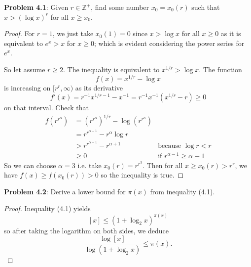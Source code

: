 \documentclass[12pt]{article}
\newcommand{\Z}{\mathbb{Z}}
\begin{document}
\fi

\textbf{Problem 4.1}: Given $r \in \Z^+$, find some number $x_0 = x_0(r)$ such that $x > (\log x)^r$ for all $x \geq x_0$.

\begin{proof}
For $r = 1$, we just take $x_0(1) = 0$ since $x > \log x$ for all $x \geq 0$ as it is equivalent to $e^x > x$ for $x \geq 0$; which is evident considering the power series for $e^x$.

So let assume $r \geq 2$. The inequality is equivalent to $x^{1/r} > \log x$. The function
$$f(x) = x^{1/r} - \log x$$
is increasing on $[r^r, \infty)$ as its derivative
$$f'(x) = r^{-1} x^{1/r - 1} - x^{-1} = r^{-1} x^{-1} (x^{1/r} - r) \geq 0$$
on that interval. Check that
\begin{align*}
f(r^{r^\alpha}) &= (r^{r^\alpha})^{1/r} - \log(r^{r^\alpha})\\
&= r^{r^{\alpha - 1}} - r^\alpha \log r\\
&> r^{r^{\alpha - 1}} - r^{\alpha + 1} &\text{because } \log r < r\\
&\geq 0 &\text{if } r^{\alpha - 1} \geq \alpha + 1
\end{align*}
So we can choose $\alpha = 3$ i.e. take $x_0(r) = r^{r^3}$. Then for all $x \geq x_0(r) > r^r$, we have $f(x) \geq f(x_0(r)) > 0$ so the inequality is true. 
\end{proof}

\textbf{Problem 4.2}: Derive a lower bound for $\pi(x)$ from inequality (4.1).

\begin{proof}
Inequality (4.1) yields
$$[x] \leq (1 + \log_2 x)^{\pi(x)}$$
so after taking the logarithm on both sides, we deduce
$$\frac{\log [x]}{\log (1 + \log_2 x)} \leq \pi(x).$$
\end{proof}

\unless\ifdefined\IsMainDocument
\end{document}
